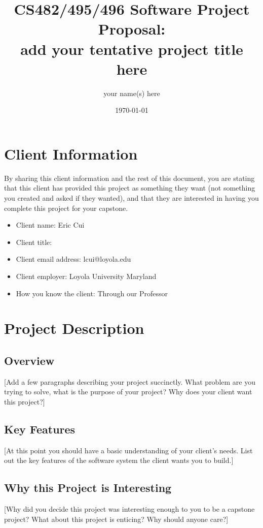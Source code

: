 \documentclass{article}
\title{CS482/495/496 Software Project Proposal: \\ 
add your tentative project title here}
\author{your name(s) here }
\date{\today}
\begin{document}
\maketitle %

\section{Client Information}
By sharing this client information and the rest of this document, you are stating that this client has provided this project as something they want (not something you created and asked if they wanted), and that they are interested in having you complete this project for your capstone.
\begin{itemize}
    \item Client name: Eric Cui
    \item Client title: 
    \item Client email address: lcui@loyola.edu
    \item Client employer: Loyola University Maryland
    \item How you know the client: Through our Professor
\end{itemize}

\section{Project Description}

\subsection{Overview}
[Add a few paragraphs describing your project succinctly. What problem are you trying to solve, what is the purpose of your project? Why does your client want this project?]

\subsection{Key Features}
[At this point you should have a basic understanding of your client's needs. List out the key features of the software system the client wants you to build.]

\subsection{Why this Project is Interesting}
[Why did you decide this project was interesting enough to you to be a capstone project? What about this project is enticing? Why should anyone care?]
\end{document}
